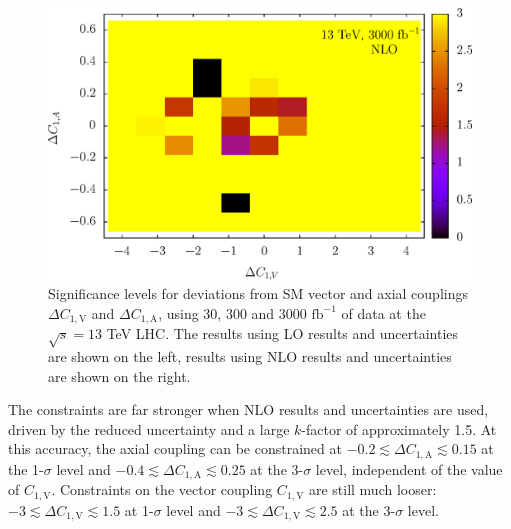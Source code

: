 \documentclass[preprint]{JHEP3}
\def\invfb {\mathrm{fb}^{-1}}
\def\ConeV{C_{1,\mathrm{V}}}
\def\DConeA{\Delta C_{1,\mathrm{A}}}
\def\DConeV{\Delta C_{1,\mathrm{V}}}
\begin{document}
\begin{figure}[t]
\includegraphics[scale=0.5]{LHC_53_LLSign_13NLO3000.eps} 
\caption{\label{fig:ix} Significance levels for deviations from SM vector and axial couplings $\DConeV$ and $\DConeA$,  using 30, 300 and 3000 $\invfb$ of data at the $\sqrt{s}=13$ TeV LHC. 
The results using LO results and uncertainties are shown on the left, results using NLO results and uncertainties are shown on the right.}
\end{figure}


The constraints are far stronger when NLO results and uncertainties are used, driven by the reduced uncertainty and a large $k$-factor of approximately 1.5. 
At this accuracy, the axial coupling can be constrained at $-0.2 \lesssim \DConeA \lesssim 0.15$ at the 1-$\sigma$ level and $-0.4 \lesssim \DConeA \lesssim 0.25$ 
at the 3-$\sigma$ level, independent of the value of $\ConeV$. Constraints on the vector coupling $\ConeV$ are still much looser: 
$-3 \lesssim \DConeV \lesssim 1.5$ at 1-$\sigma$ level and $-3 \lesssim \DConeV \lesssim 2.5$ at the 3-$\sigma$ level.
\end{document}
